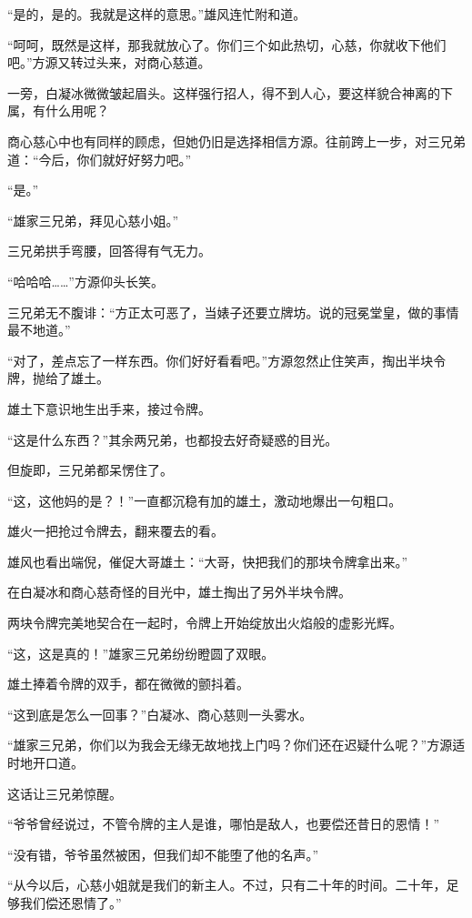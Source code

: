 \begin{this_body}
“是的，是的。我就是这样的意思。”雄风连忙附和道。

“呵呵，既然是这样，那我就放心了。你们三个如此热切，心慈，你就收下他们吧。”方源又转过头来，对商心慈道。

一旁，白凝冰微微皱起眉头。这样强行招人，得不到人心，要这样貌合神离的下属，有什么用呢？

商心慈心中也有同样的顾虑，但她仍旧是选择相信方源。往前跨上一步，对三兄弟道：“今后，你们就好好努力吧。”

“是。”

“雄家三兄弟，拜见心慈小姐。”

三兄弟拱手弯腰，回答得有气无力。

“哈哈哈……”方源仰头长笑。

三兄弟无不腹诽：“方正太可恶了，当婊子还要立牌坊。说的冠冕堂皇，做的事情最不地道。”

“对了，差点忘了一样东西。你们好好看看吧。”方源忽然止住笑声，掏出半块令牌，抛给了雄土。

雄土下意识地生出手来，接过令牌。

“这是什么东西？”其余两兄弟，也都投去好奇疑惑的目光。

但旋即，三兄弟都呆愣住了。

“这，这他妈的是？！”一直都沉稳有加的雄土，激动地爆出一句粗口。

雄火一把抢过令牌去，翻来覆去的看。

雄风也看出端倪，催促大哥雄土：“大哥，快把我们的那块令牌拿出来。”

在白凝冰和商心慈奇怪的目光中，雄土掏出了另外半块令牌。

两块令牌完美地契合在一起时，令牌上开始绽放出火焰般的虚影光辉。

“这，这是真的！”雄家三兄弟纷纷瞪圆了双眼。

雄土捧着令牌的双手，都在微微的颤抖着。

“这到底是怎么一回事？”白凝冰、商心慈则一头雾水。

“雄家三兄弟，你们以为我会无缘无故地找上门吗？你们还在迟疑什么呢？”方源适时地开口道。

这话让三兄弟惊醒。

“爷爷曾经说过，不管令牌的主人是谁，哪怕是敌人，也要偿还昔日的恩情！”

“没有错，爷爷虽然被困，但我们却不能堕了他的名声。”

“从今以后，心慈小姐就是我们的新主人。不过，只有二十年的时间。二十年，足够我们偿还恩情了。”


\end{this_body}
